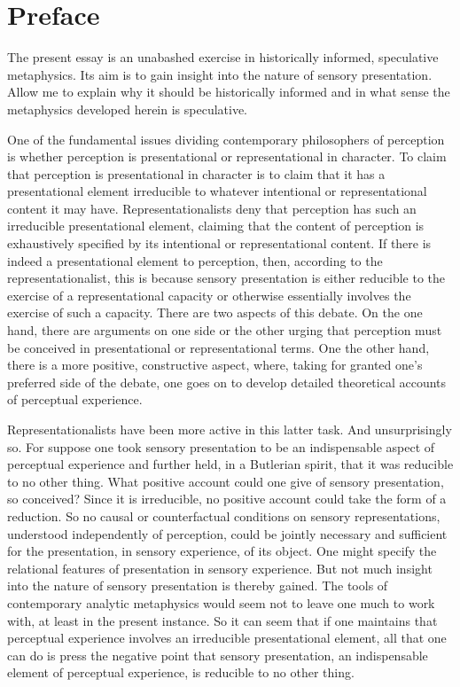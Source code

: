 \chapter*{Preface} %
\label{cha:preface}

The present essay is an unabashed exercise in historically informed, speculative metaphysics. Its aim is to gain insight into the nature of sensory presentation. Allow me to explain why it should be historically informed and in what sense the metaphysics developed herein is speculative.

One of the fundamental issues dividing contemporary philosophers of perception is whether perception is presentational or representational in character. To claim that perception is presentational in character is to claim that it has a presentational element irreducible to whatever intentional or representational content it may have. Representationalists deny that perception has such an irreducible presentational element, claiming that the content of perception is exhaustively specified by its intentional or representational content. If there is indeed a presentational element to perception, then, according to the representationalist, this is because sensory presentation is either reducible to the exercise of a representational capacity or otherwise essentially involves the exercise of such a capacity. There are two aspects of this debate. On the one hand, there are arguments on one side or the other urging that perception must be conceived in presentational or representational terms. One the other hand, there is a more positive, constructive aspect, where, taking for granted one's preferred side of the debate, one goes on to develop detailed theoretical accounts of perceptual experience. 

Representationalists have been more active in this latter task. And unsurprisingly so. For suppose one took sensory presentation to be an indispensable aspect of perceptual experience and further held, in a Butlerian spirit, that it was reducible to no other thing. What positive account could one give of sensory presentation, so conceived? Since it is irreducible, no positive account could take the form of a reduction. So no causal or counterfactual conditions on sensory representations, understood independently of perception, could be jointly necessary and sufficient for the presentation, in sensory experience, of its object. One might specify the relational features of presentation in sensory experience. But not much insight into the nature of sensory presentation is thereby gained. The tools of contemporary analytic metaphysics would seem not to leave one much to work with, at least in the present instance. So it can seem that if one maintains that perceptual experience involves an irreducible presentational element, all that one can do is press the negative point that sensory presentation, an indispensable element of perceptual experience, is reducible to no other thing.

